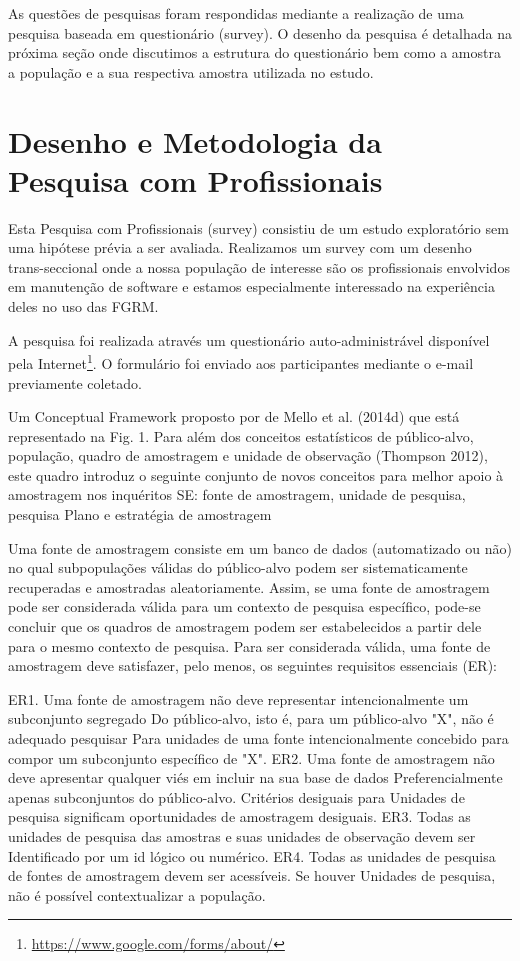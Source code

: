As questões de pesquisas foram respondidas mediante a realização de uma pesquisa
baseada em questionário (survey). O desenho da pesquisa é detalhada na próxima
seção onde discutimos a estrutura do questionário bem como a amostra a população
e a sua respectiva amostra utilizada no estudo.

\section{Desenho e Metodologia da Pesquisa com Profissionais}
\label{sec:desenho_da_pesquisa_com_profissionais}

Esta Pesquisa com Profissionais (survey) consistiu de um estudo exploratório sem
uma hipótese prévia a ser avaliada. Realizamos um survey com um desenho
trans-seccional\cite{kitchenham2002principles} onde a nossa população de
interesse são os profissionais envolvidos em manutenção de software e estamos
especialmente interessado na experiência deles no uso das FGRM\@. 

A pesquisa foi realizada através um questionário auto-administrável disponível
pela Internet\footnote{\url{https://www.google.com/forms/about/}}. O formulário
foi enviado aos participantes mediante o e-mail previamente coletado.

Um Conceptual Framework proposto por de Mello et al. (2014d) que está
representado na Fig. 1. Para além dos conceitos estatísticos de público-alvo,
população, quadro de amostragem e unidade de observação (Thompson 2012), este
quadro introduz o seguinte conjunto de novos conceitos para melhor apoio à
amostragem nos inquéritos SE: fonte de amostragem, unidade de pesquisa, pesquisa
	Plano e estratégia de amostragem

Uma fonte de amostragem consiste em um banco de dados (automatizado ou não) no
qual subpopulações válidas do público-alvo podem ser sistematicamente
recuperadas e amostradas aleatoriamente. Assim, se uma fonte de amostragem pode
ser considerada válida para um contexto de pesquisa específico, pode-se concluir
que os quadros de amostragem podem ser estabelecidos a partir dele para o mesmo
contexto de pesquisa. Para ser considerada válida, uma fonte de amostragem deve
satisfazer, pelo menos, os seguintes requisitos essenciais (ER):

ER1. Uma fonte de amostragem não deve representar intencionalmente um
subconjunto segregado Do público-alvo, isto é, para um público-alvo "X", não é
adequado pesquisar Para unidades de uma fonte intencionalmente concebido para
compor um subconjunto específico de "X".
ER2. Uma fonte de amostragem não deve apresentar qualquer viés em incluir na sua
base de dados Preferencialmente apenas subconjuntos do público-alvo. Critérios
desiguais para Unidades de pesquisa significam oportunidades de amostragem
desiguais.
ER3. Todas as unidades de pesquisa das amostras e suas unidades de observação
devem ser Identificado por um id lógico ou numérico.
ER4. Todas as unidades de pesquisa de fontes de amostragem devem ser acessíveis.
Se houver Unidades de pesquisa, não é possível contextualizar a população.

